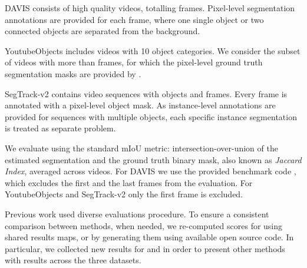 \documentclass[10pt,twocolumn,letterpaper]{article}
\makeatletter
\renewcommand{\paragraph}{\@startsection{paragraph}{4}{\z@}{0.5ex \@plus 1ex \@minus .2ex}{-0.5em}{\normalfont \normalsize \bfseries}}
\newcommand{\segtrack}{SegTrack-v2}
\makeatother
\begin{document}
DAVIS \cite{Perazzi2016Cvpr} consists of  high quality videos, totalling  frames. Pixel-level segmentation annotations are provided for each frame, where one single object or two connected objects are
separated from the background.

YoutubeObjects \cite{Prest2012Cvpr} includes videos with 10 object categories. We consider the subset of  videos with more than  frames, for which the pixel-level ground truth segmentation masks are provided
by \cite{Jain2014Eccv}.

\segtrack{} \cite{Li2013Iccv} contains  video sequences with  objects and  frames. Every frame is annotated with a pixel-level object mask.
As instance-level annotations are provided for sequences with multiple objects, each specific instance segmentation is treated as separate problem.

\paragraph{Evaluation}
We evaluate using the standard mIoU metric: intersection-over-union of the estimated segmentation and the ground truth binary mask, also known as \emph{Jaccard Index}, averaged across videos.
For DAVIS we use the provided benchmark code \cite{Perazzi2016Cvpr}, which excludes the first and the last frames from the evaluation. For YoutubeObjects and \segtrack{} only the first frame is excluded.

Previous work used diverse evaluations procedure. To ensure a consistent comparison between methods, when needed, we re-computed scores for using shared results maps, or by generating them using available open source code.
In particular, we collected new results for  \cite{Tsai2016Cvpr} and  \cite{Maerki2016Cvpr} in order to present other methods with results across the three datasets.
\end{document}
